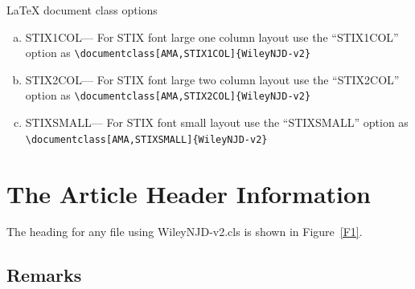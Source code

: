 \documentclass[AMA,STIX1COL]{WileyNJD-v2}
\begin{document}
LaTeX document class options

\begin{flushleft}
\begin{enumerate}[a.]
\item STIX1COL--- For STIX font large one column layout use the ``STIX1COL'' option as \verb"\documentclass[AMA,STIX1COL]{WileyNJD-v2}"
\item STIX2COL--- For STIX font large two column layout use the ``STIX2COL'' option as \verb"\documentclass[AMA,STIX2COL]{WileyNJD-v2}"
\item STIXSMALL--- For STIX font small layout use the ``STIXSMALL'' option as \verb"\documentclass[AMA,STIXSMALL]{WileyNJD-v2}"
\end{enumerate}
\end{flushleft}



\section{The Article Header Information}
The heading for any file using \textsf{WileyNJD-v2.cls} is shown in
Figure~\ref{F1}.

\subsection{Remarks}
\end{document}
